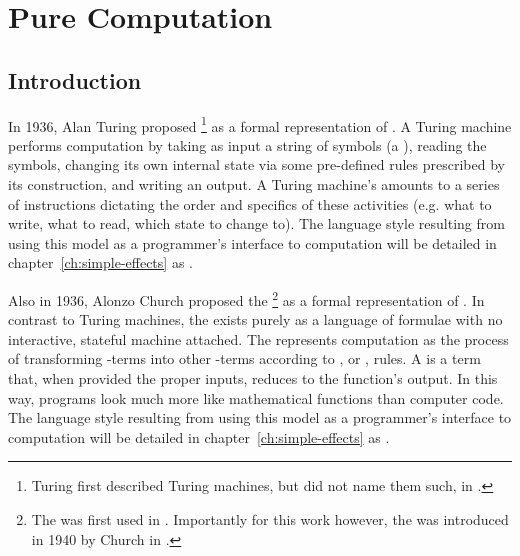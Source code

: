 \chapter{Pure Computation}
\label{ch:introduction}

\section{Introduction}


In 1936, Alan Turing proposed %
\footnote{
  Turing first described Turing machines, but did not name them such, in \cite{Turing1936}.
}
as a formal representation of .
A Turing machine performs computation by taking as input a string of symbols (a ), reading the symbols, changing its own internal state via some pre-defined rules prescribed by its construction, and writing an output.
A Turing machine's  amounts to a series of instructions dictating the order and specifics of these activities (e.g. what to write, what to read, which state to change to).
The language style resulting from using this model as a programmer's interface to computation will be detailed in chapter~\ref{ch:simple-effects} as .

Also in 1936, Alonzo Church proposed the \ep{\lc}%
\footnote{
  The \ep{\lc} was first used in \cite{Church1936}.
  Importantly for this work however, the  was introduced in 1940 by Church in \cite{Church1940}.
}
as a formal representation of .
In contrast to Turing machines, the \lc exists purely as a language of formulae with no interactive, stateful machine attached.
The \lc represents computation as the process of transforming \lc-terms into other \lc-terms according to , or , rules.
A \lc {} is a term that, when provided the proper inputs, reduces to the function's output.
In this way, \lc programs look much more like mathematical functions than computer code.
The language style resulting from using this model as a programmer's interface to computation will be detailed in chapter~\ref{ch:simple-effects} as .

